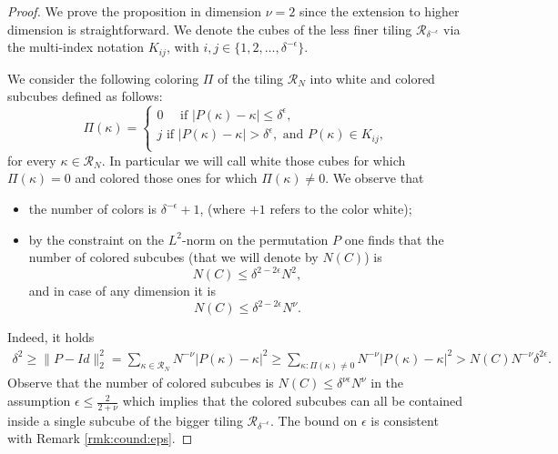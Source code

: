 \documentclass[12 pt]{article}
\theoremstyle{definition} \newtheorem{definition}{Definition}[section]
\theoremstyle{definition} \newtheorem{remark}[definition]{Remark}
\theoremstyle{plain} \newtheorem{lemma}[definition]{Lemma}
\theoremstyle{plain} \newtheorem{proposition}[definition]{Proposition}
\theoremstyle{plain} \newtheorem{theorem}[definition]{Theorem}
\theoremstyle{plain} \newtheorem{corollary}[definition]{Corollary}
\theoremstyle{definition} \newtheorem{example}[definition]{Example}
\theoremstyle{definition} \newtheorem{assumption}[definition]{Assumption}
\theoremstyle{definition} \newtheorem{conjecture}[definition]{Conjecture}
\newcommand{\1}{\mathbbm 1}
\numberwithin{equation}{section}
\begin{document}
\begin{proof}
We prove the proposition in dimension $\nu=2$ since the extension to higher dimension is straightforward.
We denote the cubes of the less finer tiling $\mathcal{R}_{\delta^{-\epsilon}}$ via the multi-index notation $K_{ij}$, with 
$i,j\in\lbrace 1,2,\dots,\delta^{-\epsilon }\rbrace.$

We consider the following coloring $\Pi$ of the tiling $\mathcal R_N$ into white and colored subcubes defined as follows:
\begin{equation*}
    \Pi (\kappa)=\begin{cases}
        0\quad\text{ if } | P(\kappa)-\kappa|\leq\delta^\epsilon, \\
        j \text{ if } | P(\kappa)-\kappa|>\delta^\epsilon,\text{ and } P(\kappa)\in K_{ij}, \\
    \end{cases}
    \end{equation*}
for every $\kappa\in\mathcal {R}_N$.
In particular we will call white those cubes for which $\Pi(\kappa)=0$ and  colored those ones for which $\Pi(\kappa)\not =0$. We observe that
\begin{itemize}
    \item the number of colors is $\delta^{-\epsilon}+1$, (where $+1$ refers to the color white);
    \item by the constraint on the $L^2$-norm on the permutation $P$ one finds that the number of colored subcubes (that we will denote by $N(C)$) is 
    \begin{equation*}
        N(C)\leq \delta^{2-2\epsilon}N^2,
    \end{equation*}
    and in case of any dimension it is
    \begin{equation*}
        N(C)\leq \delta^{2-2\epsilon}N^\nu.
    \end{equation*}
\end{itemize}
Indeed, it holds
\begin{align*}
    \delta^2\geq \|P-Id\|_2^2=\sum_{\kappa\in\mathcal{R}_N}N^{-\nu}|P(\kappa)-\kappa|^2\geq \sum_{\kappa: \Pi(\kappa)\not=0} N^{-\nu}|P(\kappa)-\kappa|^2> N(C)N^{-\nu}\delta^{2\epsilon}.
\end{align*}
Observe that the number of colored subcubes is $N(C)\leq \delta^{\nu\epsilon} N^\nu$ in the assumption $\epsilon\leq \frac{2}{2+\nu}$ which implies that the colored subcubes can all be contained inside a single subcube of the bigger tiling $\mathcal{R}_{\delta^{-\epsilon}}$. The bound on $\epsilon$ is consistent with Remark \ref{rmk:cound:eps}.


\end{proof}
\end{document}
